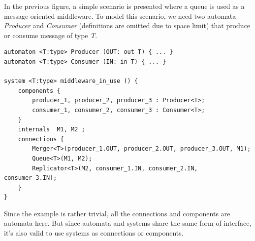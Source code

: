 \begin{example} In the previous figure, a simple scenario is presented where a queue is used as a message-oriented middleware. To model this scenario, we need two automata \emph{Producer} and \emph{Consumer} (definitions are omitted due to space limit) that produce or consume message of type \emph{T}.
\begin{lstlisting}
automaton <T:type> Producer (OUT: out T) { ... }
automaton <T:type> Consumer (IN: in T) { ... }

system <T:type> middleware_in_use () {
    components {
        producer_1, producer_2, producer_3 : Producer<T>;
        consumer_1, consumer_2, consumer_3 : Consumer<T>;
    }
    internals  M1, M2 ;
    connections {
        Merger<T>(producer_1.OUT, producer_2.OUT, producer_3.OUT, M1);
        Queue<T>(M1, M2);
        Replicator<T>(M2, consumer_1.IN, consumer_2.IN, consumer_3.IN);
    }
}
\end{lstlisting}
\end{example}

Since the example is rather trivial, all the connections and components are automata here. But since automata and systems share the same form of interface, it's also valid to use systems as connections or components.

\label{subsec:functions}